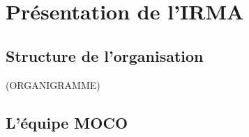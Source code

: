 
\chapter{Présentation de l'IRMA} %

\label{Chapter2} %


\section{Structure de l'organisation}
(ORGANIGRAMME)


\section{L'équipe MOCO}

